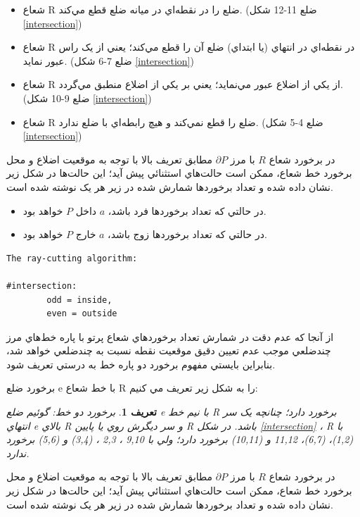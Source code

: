 \documentclass{book}
\newtheorem{defn}[section]{تعریف}
\begin{document}
\begin{itemize} 
    \item
    شعاع R ضلع را در نقطه‌اي در ميانه ضلع قطع مي‌کند. (ضلع 11-12 شکل \ref{intersection})
    \item
    شعاع R در نقطه‌اي در انتهاي (يا ابتداي) ضلع آن را قطع مي‌کند؛ يعني از يک راس عبور نمايد. (ضلع 7-6 شکل \ref{intersection})
    \item
    شعاع R از يکي از اضلاع عبور مي‌نمايد؛ يعني بر يکي از اضلاع منطبق مي‌گردد. (ضلع 9-10 شکل \ref{intersection})
    \item
    شعاع R ضلع را قطع نمي‌کند و هيچ رابطه‌اي با ضلع ندارد. (ضلع 4-5 شکل \ref{intersection})
\end{itemize}

در برخورد شعاع $R$ با مرز $\partial P$ مطابق تعريف بالا با توجه به موقعيت اضلاع و محل برخورد خط شعاع، ممکن است حالت‌هاي استثنائي پيش آيد؛ اين حالت‌ها در شکل زير نشان داده شده و تعداد برخوردها شمارش شده در زير هر يک نوشته شده است.

\begin{itemize} 
    \item
    در حالتي که تعداد برخوردها فرد باشد، $a$ داخل $P$ خواهد بود.
    \item
    در حالتي که تعداد برخوردها زوج باشد، $a$ خارج $P$ خواهد بود.
\end{itemize}


\begin{latin}
\begin{verbatim}
The ray-cutting algorithm: 

#intersection: 
        odd = inside, 
        even = outside
\end{verbatim}
\end{latin}

از آنجا که عدم دقت در شمارش تعداد برخوردهاي شعاع پرتو با پاره خط‌هاي مرز چندضلعي موجب عدم تعيين دقيق موقعيت نقطه نسبت به چندضلعي خواهد شد، بنابراين بايستي مفهوم برخورد دو پاره خط به درستي تعريف شود.

برخورد ضلع e با خط شعاع R را به شکل زير تعريف مي کنيم:

\begin{defn}
    برخورد دو خط: گوئيم ضلع e با نيم خط R برخورد دارد؛ چنانچه يک سر انتهاي e بالاي R و سر ديگرش روي يا پايين R باشد.  در شکل \ref{intersection} ، R با (1,2)، (6,7)، 11,12 و  (10,11) برخورد دارد؛ ولي با  9,10 ، 2,3 ، (3,4) و (5,6) برخورد ندارد. 
\end{defn}

در برخورد شعاع $R$ با مرز $\partial P$ مطابق تعريف بالا با توجه به موقعيت اضلاع و محل برخورد خط شعاع، ممکن است حالت‌هاي استثنائي پيش آيد؛ اين حالت‌ها در شکل زير نشان داده شده و تعداد برخوردها شمارش شده در زير هر يک نوشته شده است.
\end{document}
